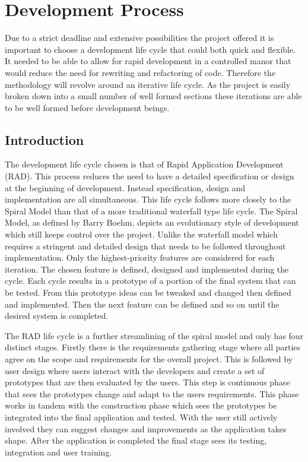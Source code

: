 \chapter{Development Process}
Due to a strict deadline and extensive possibilities the project offered it is important to choose a development life cycle that could both quick and flexible. It needed to be able to allow for rapid development in a controlled manor that would reduce the need for rewriting and refactoring of code. Therefore the methodology will revolve around an iterative life cycle. As the project is easily broken down into a small number of well formed sections these iterations are able to be well formed before development beings.

\section{Introduction}
The development life cycle chosen is that of Rapid Application Development (RAD). This process reduces the need to have a detailed specification or design at the beginning of development. Instead specification, design and implementation are all simultaneous. This life cycle follows more closely to the Spiral Model than that of a more traditional waterfall type life cycle. The Spiral Model, as defined by Barry Boehm\cite{spiral_model}, depicts an evolutionary style of development which still keeps control over the project. Unlike the waterfall model which requires a stringent and detailed design that needs to be followed throughout implementation. Only the highest-priority features are considered for each iteration. The chosen feature is defined, designed and implemented during the cycle. Each cycle results in a prototype of a portion of the final system that can be tested. From this prototype ideas can be tweaked and changed then defined and implemented. Then the next feature can be defined and so on until the desired system is completed.

The RAD life cycle is a further streamlining of the spiral model and only has four distinct stages. Firstly there is the requirements gathering stage where all parties agree on the scope and requirements for the overall project. This is followed by user design where users interact with the developers and create a set of prototypes that are then evaluated by the users. This step is continuous phase that sees the prototypes change and adapt to the users requirements. This phase works in tandem with the construction phase which sees the prototypes be integrated into the final application and tested. With the user still actively involved they can suggest changes and improvements as the application takes shape. After the application is completed the final stage sees its testing, integration and user training.


